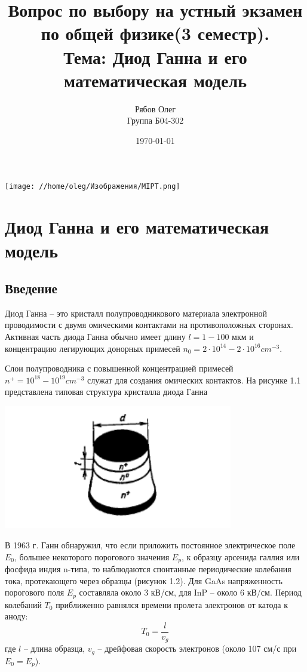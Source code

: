 \documentclass[a4paper, 12pt]{article}
\begin{document}
\begin{titlepage}
    \title{Вопрос по выбору на устный экзамен\\
    по общей физике(3 семестр).\\
    Тема: Диод Ганна и его математическая модель
    }
    \author{Рябов Олег \\
    Группа Б04-302}
    \date{\today}
    \maketitle
    \vfill
    \begin{center}
        \texttt{[image: //home/oleg/Изображения/MIPT.png]}
    \end{center}
\end{titlepage}

\setcounter{page}{2}
\tableofcontents
\newpage


\section{Диод Ганна и его математическая модель}
\subsection{Введение}

Диод Ганна – это кристалл полупроводникового материала электронной
проводимости с двумя омическими контактами на противоположных сторонах.
Активная часть диода Ганна обычно имеет длину $l = 1-100$ мкм и концентрацию легирующих донорных примесей
$n_0 = 2\cdot 10^{14}-2\cdot10^{16} cm^{-3}$.

Слои полупроводника с
повышенной концентрацией примесей $n^+ = 10^{18}-10^{19} cm^{-3}$ служат для создания
омических контактов. На рисунке 1.1 представлена типовая структура кристалла
диода Ганна
\begin{center}
    \includegraphics[width=100mm]{./pictures/diod.png}
\end{center}
В 1963 г. Ганн обнаружил, что если приложить постоянное электрическое
поле $E_0$, большее некоторого порогового значения $E_p$, к образцу арсенида галлия
или фосфида индия n-типа, то наблюдаются спонтанные периодические
колебания тока, протекающего через образцы (рисунок 1.2). Для GaAs
напряженность порогового поля $E_p$ составляла около 3 кВ/см, для InP – около 6
кВ/см. Период колебаний $T_0$ приближенно равнялся времени пролета электронов
от катода к аноду:
\[T_0 = \frac{l}{v_g}\]
где $l$ – длина образца, $v_g$ – дрейфовая скорость электронов (около 107 см/с при
$E_0 = E_p$).
\end{document}
